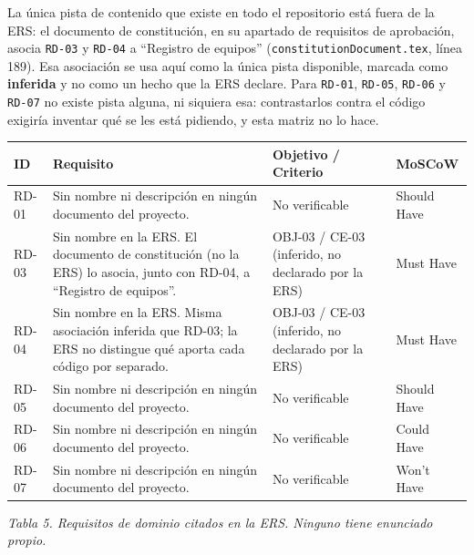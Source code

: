 \documentclass[12pt,varwidth=170mm,border=10pt]{standalone}
\newcommand{\ruta}[1]{\nolinkurl{#1}}
\newcommand{\tablecaption}[2]{%
  \par\vspace{0.4em}%
  \begin{center}
    \footnotesize\textit{Tabla #1. #2}
  \end{center}
  \vspace{1.0em}%
}
\begin{document}
La única pista de contenido que existe en todo el repositorio está fuera de la ERS: el documento de constitución, en su apartado de requisitos de aprobación, asocia \texttt{RD-03} y \texttt{RD-04} a ``Registro de equipos'' (\ruta{constitutionDocument.tex}, línea 189). Esa asociación se usa aquí como la única pista disponible, marcada como \textbf{inferida} y no como un hecho que la ERS declare. Para \texttt{RD-01}, \texttt{RD-05}, \texttt{RD-06} y \texttt{RD-07} no existe pista alguna, ni siquiera esa: contrastarlos contra el código exigiría inventar qué se les está pidiendo, y esta matriz no lo hace.

\begingroup
\small
\begin{center}
\begin{tabular}{|p{1.5cm}|p{6.4cm}|p{2.8cm}|p{2.3cm}|}
\hline
\textbf{ID} & \textbf{Requisito} & \textbf{Objetivo / Criterio} & \textbf{MoSCoW} \\
\hline
RD-01 & Sin nombre ni descripción en ningún documento del proyecto. & No verificable & Should Have \\
\hline
RD-03 & Sin nombre en la ERS. El documento de constitución (no la ERS) lo asocia, junto con RD-04, a ``Registro de equipos''. & OBJ-03 / CE-03 \newline (inferido, no declarado por la ERS) & Must Have \\
\hline
RD-04 & Sin nombre en la ERS. Misma asociación inferida que RD-03; la ERS no distingue qué aporta cada código por separado. & OBJ-03 / CE-03 \newline (inferido, no declarado por la ERS) & Must Have \\
\hline
RD-05 & Sin nombre ni descripción en ningún documento del proyecto. & No verificable & Should Have \\
\hline
RD-06 & Sin nombre ni descripción en ningún documento del proyecto. & No verificable & Could Have \\
\hline
RD-07 & Sin nombre ni descripción en ningún documento del proyecto. & No verificable & Won't Have \\
\hline
\end{tabular}
\end{center}
\tablecaption{5}{Requisitos de dominio citados en la ERS. Ninguno tiene enunciado propio.}
\endgroup
\end{document}
